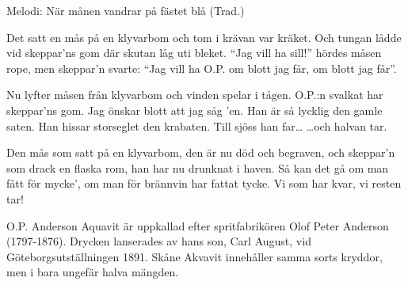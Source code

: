 \begin{song}

\begin{songmeta}
Melodi: När månen vandrar på fästet blå (Trad.)
\end{songmeta}

\begin{songtext}
Det satt en mås på en klyvarbom
och tom i krävan var kräket.
Och tungan lådde vid skeppar'ns gom
där skutan låg uti bleket.
\textquotedblleft{}Jag vill ha sill!\textquotedblright{} hördes måsen rope,
men skeppar'n svarte: \textquotedblleft{}Jag vill ha O.P.
om blott jag får,
om blott jag får\textquotedblright{}.

Nu lyfter måsen från klyvarbom
och vinden spelar i tågen.
O.P.:n svalkat har skeppar'ns gom.
Jag önskar blott att jag såg 'en.
Han är så lycklig den gamle saten.
Han hissar storseglet den krabaten.
Till sjöss han far\ldots
\ldots{}och halvan tar.

Den mås som satt på en klyvarbom,
den är nu död och begraven,
och skeppar'n som drack en flaska rom,
han har nu drunknat i haven.
Så kan det gå om man fått för mycke',
om man för brännvin har fattat tycke.
Vi som har kvar,
vi resten tar!
\end{songtext}

\begin{songnotes}
O.P. Anderson Aquavit är uppkallad efter spritfabrikören Olof Peter Anderson
(1797-1876). Drycken lanserades av hans son, Carl August, vid
Göteborgsutställningen 1891. Skåne Akvavit innehåller samma sorts kryddor, men
i bara ungefär halva mängden.
\end{songnotes}

\end{song}
